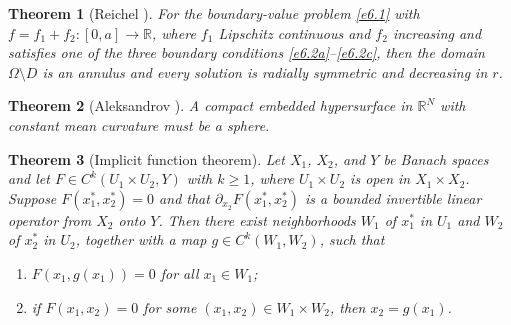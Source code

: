 \documentclass[reqno]{amsart}
\numberwithin{equation}{section}
\newtheorem{theorem}{Theorem}[section]
\numberwithin{equation}{section}
\numberwithin{equation}{section}
\begin{document}
\begin{theorem}[Reichel \cite{Reichel}]\label{thm6.3}
For the boundary-value problem \eqref{e6.1} with \(f = f_1 + f_2 \colon [0,a] \to \mathbb{R}\), where \(f_1\) Lipschitz continuous and \(f_2\) increasing and satisfies one of the three boundary conditions \eqref{e6.2a}–\eqref{e6.2c}, then the domain \(\Omega \setminus D\) is an annulus and every solution is radially symmetric and  decreasing in $r$.
\end{theorem}

\begin{theorem}[Aleksandrov \cite{Aleksandrov}]\label{thm6.4}
A compact embedded hypersurface in \(\mathbb{R}^N\) with constant mean curvature must be a sphere.
\end{theorem}

\begin{theorem}[Implicit function theorem]\label{thm6.5}
Let \(X_1\), \(X_2\), and \(Y\) be Banach spaces and let \(F \in C^k(U_1 \times U_2, Y)\) with \(k \geq 1\), where \(U_1 \times U_2\) is open in \(X_1 \times X_2\). Suppose \(F(x_1^*, x_2^*) = 0\) and that \(\partial_{x_2} F(x_1^*, x_2^*)\) is a bounded invertible linear operator from \(X_2\) onto \(Y\). Then there exist neighborhoods \(W_1\) of \(x_1^*\) in \(U_1\) and \(W_2\) of \(x_2^*\) in \(U_2\), together with a map \(g \in C^k(W_1, W_2)\), such that
\begin{enumerate}
\item \(F(x_1, g(x_1)) = 0\) for all \(x_1 \in W_1\);
\item if \(F(x_1, x_2) = 0\) for some \((x_1, x_2) \in W_1 \times W_2\), then \(x_2 = g(x_1)\).
\end{enumerate}
\end{theorem}
\end{document}
